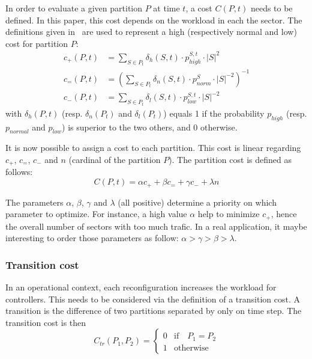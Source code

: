 \documentclass[oneside,twocolumn]{article}
\begin{document}
In order to evaluate a given partition $P$ at time $t$, a cost $C(P, t)$ needs
to be defined. In this paper, this cost depends on the workload in each the
sector. The definitions given in~\cite{ferrari2017} are used to represent a high
(respectively normal and low) cost for partition \(P\):
\begin{equation}
  \begin{aligned}
    c_+(P, t) &= \sum_{S \in P_t} \delta_{h}(S, t) \cdot p_{high}^{S, t} \cdot |S|^2\\
    c_=(P, t) &= \left(
    \sum_{S \in P_t} \delta_{n}(S, t) \cdot p_{norm}^{S} \cdot |S|^{-2}
    \right)^{-1}\\
    c_-(P, t) &= \sum_{S \in P_t} \delta_{l}(S, t) \cdot p_{low}^{S, t} \cdot |S|^{-2}
  \end{aligned}
\end{equation}
with $\delta_{h}(P, t)$ (resp. $\delta_{n}(P_t)$ and $\delta_{l}(P_t)$) equals 1
if the probability $p_{high}$ (resp. $p_{normal}$ and $p_{low}$) is superior to
the two others, and 0 otherwise.

It is now possible to assign a cost to each partition. This cost is linear
regarding $c_+$, $c_=$, $c_-$ and $n$ (cardinal of the partition $P$). The
partition cost is defined as follows:
\begin{equation}
  C(P, t) = \alpha c_+ + \beta c_= + \gamma c_- +\lambda n
\end{equation}

The parameters $\alpha$, $\beta$, $\gamma$ and $\lambda$ (all positive)
determine a priority on which parameter to optimize. For instance, a high
value $\alpha$ help to
minimize $c_+$, hence the overall number of sectors with too much trafic.
In a real application, it maybe interesting to order those parameters as
follow: $\alpha > \gamma > \beta > \lambda$.

\subsubsection{Transition cost}

In an operational context, each reconfiguration increases the workload for
controllers. This needs to be considered via the definition of a transition
cost.
A transition is the difference of two partitions separated by only on time step.
The transition cost is then
\begin{equation}
  C_{tr}(P_1, P_2) =
  \begin{cases}
    0 & \text{if} \quad P_1 = P_2\\
    1 & \text{otherwise}
  \end{cases}
\end{equation}
\end{document}
